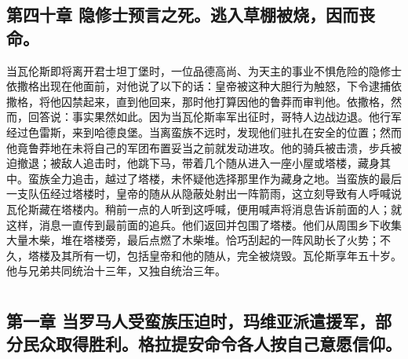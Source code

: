 
\subsection{第四十章 隐修士预言之死。逃入草棚被烧，因而丧命。}

当瓦伦斯即将离开君士坦丁堡时，一位品德高尚、为天主的事业不惧危险的隐修士依撒格出现在他面前，对他说了以下的话：皇帝被这种大胆行为触怒，下令逮捕依撒格，将他囚禁起来，直到他回来，那时他打算因他的鲁莽而审判他。依撒格，然而，回答说：事实果然如此。因为当瓦伦斯率军出征时，哥特人边战边退。他行军经过色雷斯，来到哈德良堡。当离蛮族不远时，发现他们驻扎在安全的位置；然而他竟鲁莽地在未将自己的军团布置妥当之前就发动进攻。他的骑兵被击溃，步兵被迫撤退；被敌人追击时，他跳下马，带着几个随从进入一座小屋或塔楼，藏身其中。蛮族全力追击，越过了塔楼，未怀疑他选择那里作为藏身之地。当蛮族的最后一支队伍经过塔楼时，皇帝的随从从隐蔽处射出一阵箭雨，这立刻导致有人呼喊说瓦伦斯藏在塔楼内。稍前一点的人听到这呼喊，便用喊声将消息告诉前面的人；就这样，消息一直传到最前面的追兵。他们返回并包围了塔楼。他们从周围乡下收集大量木柴，堆在塔楼旁，最后点燃了木柴堆。恰巧刮起的一阵风助长了火势；不久，塔楼及其所有一切，包括皇帝和他的随从，完全被烧毁。瓦伦斯享年五十岁。他与兄弟共同统治十三年，又独自统治三年。\par



\section{}


\subsection{第一章 当罗马人受蛮族压迫时，玛维亚派遣援军，部分民众取得胜利。格拉提安命令各人按自己意愿信仰。}

